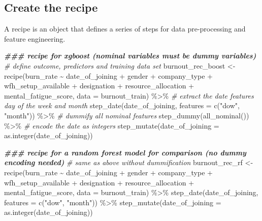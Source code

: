 \documentclass[
]{book}
\newenvironment{Shaded}{\begin{snugshade}}{\end{snugshade}}
\newcommand{\AttributeTok}[1]{\textcolor[rgb]{0.77,0.63,0.00}{#1}}
\newcommand{\CommentTok}[1]{\textcolor[rgb]{0.56,0.35,0.01}{\textit{#1}}}
\newcommand{\DocumentationTok}[1]{\textcolor[rgb]{0.56,0.35,0.01}{\textbf{\textit{#1}}}}
\newcommand{\FunctionTok}[1]{\textcolor[rgb]{0.00,0.00,0.00}{#1}}
\newcommand{\NormalTok}[1]{#1}
\newcommand{\OtherTok}[1]{\textcolor[rgb]{0.56,0.35,0.01}{#1}}
\newcommand{\SpecialCharTok}[1]{\textcolor[rgb]{0.00,0.00,0.00}{#1}}
\newcommand{\StringTok}[1]{\textcolor[rgb]{0.31,0.60,0.02}{#1}}
\begin{document}
\hypertarget{create-the-recipe}{%
\subsection{Create the recipe}\label{create-the-recipe}}

A recipe is an object that defines a series of steps for data pre-processing and feature engineering.

\begin{Shaded}
\begin{Highlighting}[]
\DocumentationTok{\#\#\# recipe for xgboost (nominal variables must be dummy variables)}
\CommentTok{\# define outcome, predictors and training data set}
\NormalTok{burnout\_rec\_boost }\OtherTok{\textless{}{-}} \FunctionTok{recipe}\NormalTok{(burn\_rate }\SpecialCharTok{\textasciitilde{}}\NormalTok{ date\_of\_joining }\SpecialCharTok{+}\NormalTok{ gender }\SpecialCharTok{+}
\NormalTok{                            company\_type }\SpecialCharTok{+}\NormalTok{ wfh\_setup\_available }\SpecialCharTok{+}
\NormalTok{                            designation }\SpecialCharTok{+}\NormalTok{ resource\_allocation }\SpecialCharTok{+}
\NormalTok{                            mental\_fatigue\_score,}
                            \AttributeTok{data =}\NormalTok{ burnout\_train) }\SpecialCharTok{\%\textgreater{}\%}
  \CommentTok{\# extract the date features day of the week and month}
  \FunctionTok{step\_date}\NormalTok{(date\_of\_joining, }\AttributeTok{features =} \FunctionTok{c}\NormalTok{(}\StringTok{"dow"}\NormalTok{, }\StringTok{"month"}\NormalTok{)) }\SpecialCharTok{\%\textgreater{}\%}
  \CommentTok{\# dummify all nominal features}
  \FunctionTok{step\_dummy}\NormalTok{(}\FunctionTok{all\_nominal}\NormalTok{()) }\SpecialCharTok{\%\textgreater{}\%}
  \CommentTok{\# encode the date as integers}
  \FunctionTok{step\_mutate}\NormalTok{(}\AttributeTok{date\_of\_joining =} \FunctionTok{as.integer}\NormalTok{(date\_of\_joining))}

\DocumentationTok{\#\#\# recipe for a random forest model for comparison (no dummy encoding needed)}
\CommentTok{\# same as above without dummification}
\NormalTok{burnout\_rec\_rf }\OtherTok{\textless{}{-}} \FunctionTok{recipe}\NormalTok{(burn\_rate }\SpecialCharTok{\textasciitilde{}}\NormalTok{ date\_of\_joining }\SpecialCharTok{+}\NormalTok{ gender }\SpecialCharTok{+}
\NormalTok{                         company\_type }\SpecialCharTok{+}\NormalTok{ wfh\_setup\_available }\SpecialCharTok{+}
\NormalTok{                         designation }\SpecialCharTok{+}\NormalTok{ resource\_allocation }\SpecialCharTok{+}
\NormalTok{                         mental\_fatigue\_score,}
                         \AttributeTok{data =}\NormalTok{ burnout\_train) }\SpecialCharTok{\%\textgreater{}\%}
  \FunctionTok{step\_date}\NormalTok{(date\_of\_joining, }\AttributeTok{features =} \FunctionTok{c}\NormalTok{(}\StringTok{"dow"}\NormalTok{, }\StringTok{"month"}\NormalTok{)) }\SpecialCharTok{\%\textgreater{}\%}
  \FunctionTok{step\_mutate}\NormalTok{(}\AttributeTok{date\_of\_joining =} \FunctionTok{as.integer}\NormalTok{(date\_of\_joining))}
\end{Highlighting}
\end{Shaded}
\end{document}
